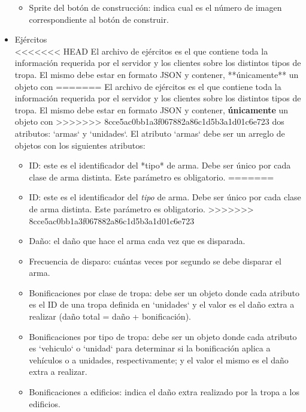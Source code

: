 \documentclass[titlepage,a4paper,12pt]{article}
\begin{document}
\begin{itemize}
\begin{itemize}
\item Sprite del botón de construcción: indica cual es el número de imagen correspondiente al botón de construir.

\end{itemize}

\item Ejércitos\\

<<<<<<< HEAD
El archivo de ejércitos es el que contiene toda la información requerida por el servidor y los clientes sobre los distintos tipos de tropa. El mismo debe estar en formato JSON y contener, **únicamente** un objeto con 
=======
El archivo de ejércitos es el que contiene toda la información requerida por el servidor y los clientes sobre los distintos tipos de tropa. El mismo debe estar en formato JSON y contener, \textbf{únicamente} un objeto con 
>>>>>>> 8cce5ac0bb1a3f067882a86c1d5b3a1d01c6e723
dos atributos: `armas` y `unidades`.  El atributo `armas` debe ser un arreglo de objetos con los siguientes atributos:


\begin{itemize}

<<<<<<< HEAD
\item ID: este es el identificador del *tipo* de arma. Debe ser único por cada clase de arma distinta. Este parámetro es obligatorio.
=======
\item ID: este es el identificador del \textit{tipo} de arma. Debe ser único por cada clase de arma distinta. Este parámetro es obligatorio.
>>>>>>> 8cce5ac0bb1a3f067882a86c1d5b3a1d01c6e723

\item Daño: el daño que hace el arma cada vez que es disparada.


\item Frecuencia de disparo: cuántas veces por segundo se debe disparar el arma.

\item Bonificaciones por clase de tropa: debe ser un objeto donde cada atributo es el ID de una tropa definida en `unidades` y el valor es el daño extra a realizar (daño total = daño + bonificación).

\item Bonificaciones por tipo de tropa: debe ser un objeto donde cada atributo es `vehiculo` o `unidad` para determinar si la bonificación aplica a vehículos o a unidades, respectivamente; y el valor el mismo es el daño extra a realizar.

\item Bonificaciones a edificios: indica el daño extra realizado por la tropa a los edificios.


\end{itemize}
\end{itemize}
\end{document}
